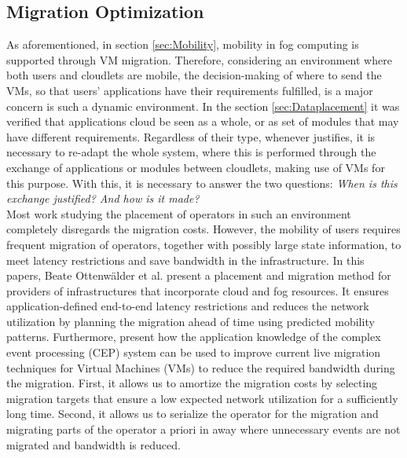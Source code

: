 \vfill\pagebreak
\subsection{Migration Optimization}
\label{sec:Migration}
As aforementioned, in section \ref{sec:Mobility}, mobility in fog computing is supported through VM migration. Therefore, considering an environment where both users and cloudlets are mobile, the decision-making of where to send the VMs, so that users' applications have their requirements fulfilled, is a major concern is such a dynamic environment. In the section \ref{sec:Dataplacement} it was verified that applications cloud be seen as a whole, or as set of modules that may have different requirements. Regardless of their type, whenever justifies, it is necessary to re-adapt the whole system, where this is performed through the exchange of applications or modules between cloudlets, making use of VMs for this purpose. With this, it is necessary to answer the two questions: \textit{When is this exchange justified? And how is it made?}\\

\cite{ottenwalder2013migcep}
Most work studying the placement of operators in such an environment completely disregards the migration costs. However, the mobility of users requires frequent migration of operators, together with possibly large state information, to meet latency restrictions and save bandwidth in the infrastructure. In this papers, Beate Ottenwälder et al. present a placement and migration method for providers of infrastructures that incorporate cloud and fog resources. It ensures application-defined end-to-end latency restrictions and reduces the network utilization by planning the migration ahead of time using predicted mobility patterns. Furthermore, present how the application knowledge of the complex event processing (CEP) system can be used to improve current live migration techniques for Virtual Machines (VMs) to reduce the required bandwidth during the migration. First, it allows us to amortize the migration costs by selecting migration targets that ensure a low expected network utilization for a sufficiently long time. Second, it allows us to serialize the operator for the migration and migrating parts of the operator a priori in away where unnecessary events are not migrated and bandwidth is reduced.\\

